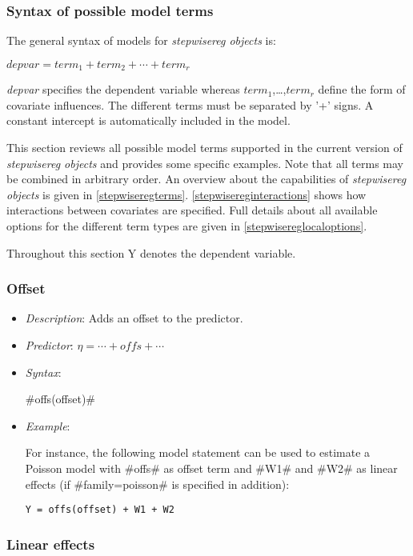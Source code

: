 \subsubsection{Syntax of possible model terms}
\label{stepwiseregmodelsyntax}

The general syntax of models for {\em stepwisereg objects} is:

$depvar = term_1 + term_2 + \cdots + term_r$

{\em depvar} specifies the dependent variable whereas
$term_1$,\dots,$term_r$ define the form of covariate influences. The
different terms must be separated by '+' signs. A constant intercept
is automatically included in the model.

This section reviews all possible model terms supported in the
current version of {\em stepwisereg objects} and provides some specific
examples. Note that all terms may be combined in arbitrary
order. An overview about the capabilities of {\em stepwisereg objects}
is given in \autoref{stepwiseregterms}. \autoref{stepwisereginteractions}
shows how interactions between covariates are specified. Full
details about all available options for the different term types are given in
\autoref{stepwisereglocaloptions}.

Throughout this section Y denotes the dependent variable.

\subsubsection*{Offset}

\begin{itemize}
\item[] {\em Description}: Adds an offset to the predictor.
\item[] {\em Predictor}: $\eta =  \cdots + offs + \cdots$
\item[] {\em Syntax}:

#offs(offset)#
\item[] {\em Example}:

For instance, the following model statement can be used to estimate
a Poisson model with #offs# as offset term and #W1# and #W2# as
linear effects (if #family=poisson# is specified in addition):

\texttt{Y = offs(offset) + W1 + W2}
\end{itemize}

\subsubsection*{Linear effects}

